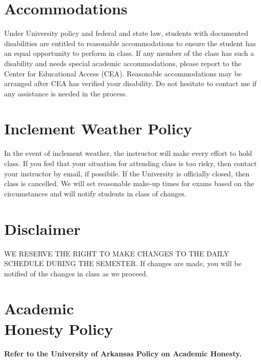 \documentclass[margin,line,pifont,palatino,courier]{res}
\begin{document}
\begin{resume}

\section{\sc Accommodations} Under University policy and federal and state law, students with documented disabilities are entitled to reasonable accommodations to ensure the student has an equal opportunity to perform in class.  If any member of the class has such a disability and needs special academic accommodations, please report to the Center for Educational Access (CEA).  Reasonable accommodations may be arranged after CEA has verified your disability.  Do not hesitate to contact me if any assistance is needed in the process.

\section{\sc Inclement Weather Policy} In the event of inclement weather, the instructor will make every effort to hold class.  If you feel that your situation for attending class is too risky, then contact your instructor by email, if possibile.  If the University is officially closed, then class is cancelled.  We will set reasonable make-up times for exams based on the circumstances and will notify students in class of changes.

\section{\sc Disclaimer} WE RESERVE THE RIGHT TO MAKE CHANGES TO THE DAILY SCHEDULE DURING THE SEMESTER.  If changes are made, you will be notified of the changes in class as we proceed.

\section{\sc Academic \\ Honesty Policy} {\bf Refer to the University of Arkansas Policy on Academic Honesty.}

\end{resume}
\end{document}
